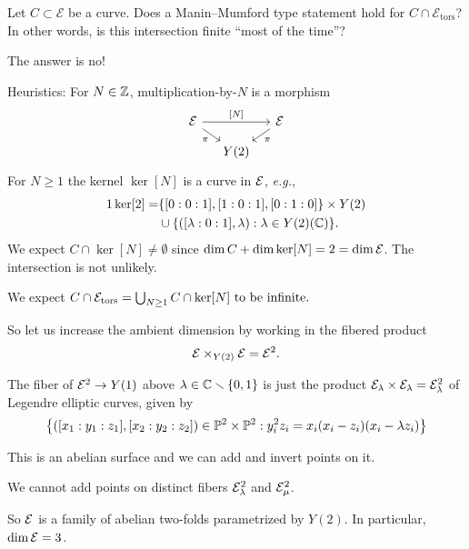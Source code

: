 \documentclass{beamer}
\begin{document}
\begin{frame}
  Let $C\subset \mathcal{E}$ be a curve. Does a
  Manin--Mumford type statement hold for $C\cap
  \mathcal{E}_{\mathrm{tors}}$? In other words, is this intersection
  finite ``most of the time''?

  The answer is \alert{no}! 

  Heuristics: For $N\in{\mathbb{Z}}$,  multiplication-by-$N$ is a
  morphism
  \begin{equation*}
    \begin{tikzcd}[ampersand replacement=\&,column sep=small, row sep=small] 
    \cE \arrow{dr}[swap]{\pi}  \arrow{rr}{[N]} \&  \& \cE\arrow{dl}{\pi}  \\
     \& Y(2)   
  \end{tikzcd}  
  \end{equation*}
  For $N\ge 1$ the kernel  $\ker[N]$ is a curve
  in ${\mathcal E}$, \textit{e.g.},
  \begin{alignat*}1
    \ker[2] = &\{[0:0:1],[1:0:1],[0:1:0]\}\times Y(2)\\
    &\cup
    \{([\lambda:0:1],\lambda) : \lambda \in Y(2)(\IC)\}.
  \end{alignat*}
  We expect $C\cap \ker[N]\not=\emptyset$
  since $\dim C + \dim \ker[N] = 2 = \dim {\mathcal E}$. The intersection is
  \alert{not} unlikely. 
  
  We expect $C\cap {\mathcal E}_{\mathrm{tors}} = \bigcup_{N\ge 1}C\cap \ker[N]
  \text{ to be infinite.}$
\end{frame}

\begin{frame}
  So let us increase the ambient dimension by  working
  in  the \alert{fibered product}
  $${\mathcal E}\times_{Y(2)}{\mathcal E}={\mathcal E}^2.$$

  \begin{example}
    The fiber of ${\mathcal E}^2\rightarrow Y(1)$ above  $\lambda\in
    {\mathbb{C}}\smallsetminus\{0,1\}$
    is just the product ${\mathcal E}_\lambda\times {\mathcal E}_\lambda={\mathcal E}^2_\lambda$ of Legendre
    elliptic curves, given by
    \begin{equation*}
      \bigl\{([x_1:y_1:z_1],[x_2:y_2:z_2]) \in{\mathbb{P}}^2\times{\mathbb{P}}^2 : y_i^2z_i =
      x_i(x_i-z_i)(x_i-\lambda z_i)\bigr\}      
    \end{equation*}

    This is an abelian surface and we can add and invert points on it.

    We \alert{cannot} add points on distinct fibers ${\mathcal E}^2_{\lambda}$
    and ${\mathcal E}^2_\mu$.

    So ${\mathcal E}$ is a family of abelian two-folds parametrized by $Y(2)$.
    In particular, $\dim {\mathcal E} = 3$. 
  \end{example}
\end{frame}
\end{document}
